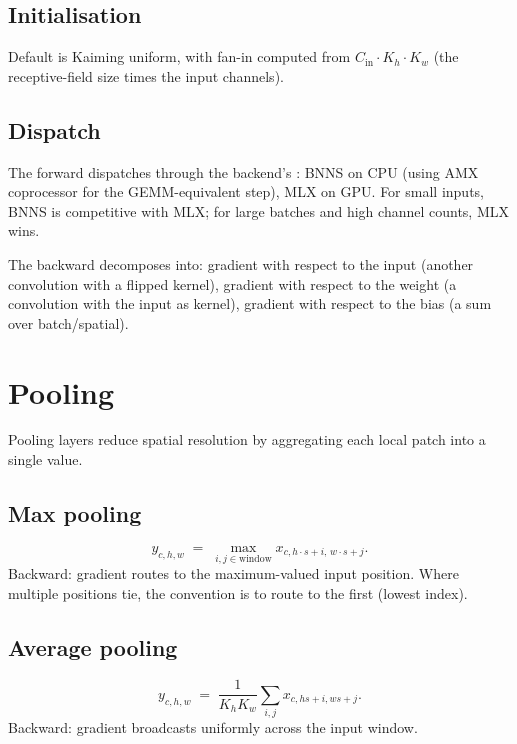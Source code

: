 \subsection{Initialisation}
\label{ssec:linear_conv_norm:conv_init}

Default is Kaiming uniform, with fan-in computed from
$C_{\text{in}} \cdot K_h \cdot K_w$ (the receptive-field size
times the input channels).

\subsection{Dispatch}
\label{ssec:linear_conv_norm:conv_dispatch}

The forward dispatches through the backend's : BNNS
on CPU (using AMX coprocessor for the GEMM-equivalent step), MLX
on GPU. For small inputs, BNNS is competitive with MLX; for
large batches and high channel counts, MLX wins.

The backward decomposes into: gradient with respect to the input
(another convolution with a flipped kernel), gradient with
respect to the weight (a convolution with the input as kernel),
gradient with respect to the bias (a sum over batch/spatial).

\section{Pooling}
\label{sec:linear_conv_norm:pooling}

Pooling layers reduce spatial resolution by aggregating each local
patch into a single value.

\subsection{Max pooling}
\label{ssec:linear_conv_norm:max_pool}

\[
y_{c, h, w} \;=\; \max_{i, j \in \text{window}}
x_{c, h \cdot s + i,\, w \cdot s + j}.
\]
Backward: gradient routes to the maximum-valued input position.
Where multiple positions tie, the convention is to route to the
first (lowest index).

\subsection{Average pooling}
\label{ssec:linear_conv_norm:avg_pool}

\[
y_{c, h, w} \;=\; \frac{1}{K_h K_w} \sum_{i, j} x_{c, h s + i, w s + j}.
\]
Backward: gradient broadcasts uniformly across the input window.

